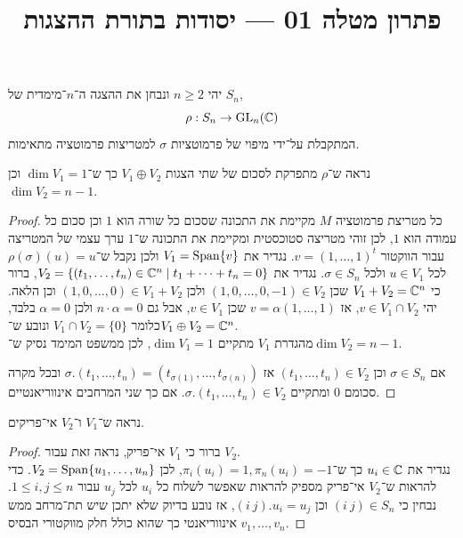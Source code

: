 
\title{פתרון מטלה 01 --- יסודות בתורת ההצגות}

\DeclareMathOperator\reg{reg}



\maketitle
\maketitleprint[red]

\question{}
יהי $n \ge 2$ ונבחן את ההצגה ה־$n$־מימדית של $S_n$,
\[
	\rho : S_n \to \operatorname{GL}_n(\mathbb{C})
\]
המתקבלת על־ידי מיפוי של פרמוטציות $\sigma$ למטריצות פרמוטציה מתאימות.

\subquestion{}
נראה ש־$\rho$ מתפרקת לסכום של שתי הצגות $V_1 \oplus V_2$ כך ש־$\dim V_1 = 1$ וכן $\dim V_2 = n - 1$.
\begin{proof}
	כל מטריצת פרמוטציה $M$ מקיימת את התכונה שסכום כל שורה הוא $1$ וכן סכום כל עמודה הוא $1$, לכן זוהי מטריצה סטוכסטית ומקיימת את התכונה ש־$1$ ערך עצמי של המטריצה עבור הווקטור $v = {(1, \ldots, 1)}^t$.
	נגדיר את $V_1 = \operatorname{Span}\{ v \}$ ולכן נקבל ש־$\rho(\sigma)(u) = u$ לכל $u \in V_1$ ולכל $\sigma \in S_n$.
	נגדיר את $V_2 = \{ (t_1, \ldots, t_n) \in \mathbb{C}^n \mid t_1 + \cdots + t_n = 0 \}$, ברור כי $V_1 + V_2 = \mathbb{C}^n$ שכן $(1, 0, \ldots, 0, -1) \in V_2$ ולכן $(1, 0, \ldots, 0) \in V_1 + V_2$ וכן הלאה.
	יהי $v \in V_1 \cap V_2$, אז $v = \alpha (1, \ldots, 1)$ שכן $v \in V_1$, אבל גם $n \cdot \alpha = 0$ ולכן $\alpha = 0$ בלבד, כלומר $V_1 \cap V_2 = \{ 0 \}$ ונובע ש־$V_1 \oplus V_2 = \mathbb{C}^n$. \\
	מהגדרת $V_1$ מתקיים $\dim V_1 = 1$, לכן ממשפט המימד נסיק ש־$\dim V_2 = n - 1$.

	אם $\sigma \in S_n$ וכן $(t_1, \ldots, t_n) \in V_2$ אז $\sigma . (t_1, \ldots, t_n) = (t_{\sigma(1)}, \ldots, t_{\sigma(n)})$ ובכל מקרה סכומם $0$ ומתקיים $\sigma . (t_1, \ldots, t_n) \in V_2$.
	אם כך שני המרחבים אינווריאנטיים.
\end{proof}

\subquestion{}
נראה ש־$V_1$ ו־$V_2$ אי־פריקים.
\begin{proof}
	ברור כי $V_1$ אי־פריק, נראה זאת עבור $V_2$. \\
	נגדיר את $u_i \in \mathbb{C}$ כך ש־$\pi_i(u_i) = 1, \pi_n(u_i) = -1$, לכן $V_2 = \operatorname{Span}\{u_1, \ldots, u_n\}$.
	כדי להראות ש־$V_2$ אי־פריק מספיק להראות שאפשר לשלוח כל $u_i$ לכל $u_j$ עבור $1 \le i, j \le n$.
	נבחין כי $(i\ j) \in S_n$ וכן $(i\ j) . u_i = u_j$, אז נובע בדיוק שלא יתכן שיש תת־מרחב ממש אינווריאנטי כך שהוא כולל חלק מווקטורי הבסיס $v_1, \ldots, v_n$.
\end{proof}

